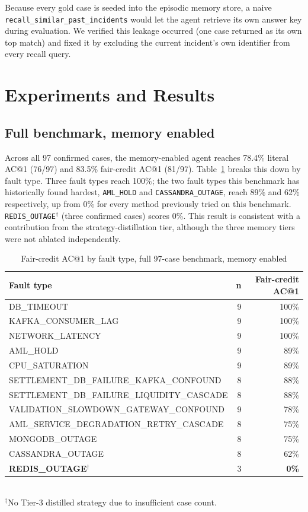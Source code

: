 \documentclass[conference]{IEEEtran}
\begin{document}
Because every gold case is seeded into the episodic memory store, a naive \texttt{recall\_similar\_past\_incidents}
would let the agent retrieve its own answer key during evaluation. We verified this leakage occurred (one case
returned as its own top match) and fixed it by excluding the current incident's own identifier from every
recall query.

\section{Experiments and Results}
\label{sec:results}

\subsection{Full benchmark, memory enabled}

Across all 97 confirmed cases, the memory-enabled agent reaches 78.4\% literal AC@1 (76/97) and 83.5\%
fair-credit AC@1 (81/97). Table~\ref{tab:byfault} breaks this down by fault type. Three fault types reach
100\%; the two fault types this benchmark has historically found hardest, \texttt{AML\_HOLD} and
\texttt{CASSANDRA\_OUTAGE}, reach 89\% and 62\% respectively, up from 0\% for every method previously tried on
this benchmark. \texttt{REDIS\_OUTAGE}$^\dagger$ (three confirmed cases) scores 0\%. This result is consistent
with a contribution from the strategy-distillation tier, although the three memory tiers were not ablated
independently.

\begin{table}[t]
\caption{Fair-credit AC@1 by fault type, full 97-case benchmark, memory enabled}
\label{tab:byfault}
\centering
\footnotesize
\begin{tabular}{@{}p{4.6cm}rr@{}}
\toprule
\textbf{Fault type} & \textbf{n} & \textbf{Fair-credit AC@1} \\
\midrule
DB\_TIMEOUT & 9 & 100\% \\
KAFKA\_CONSUMER\_LAG & 9 & 100\% \\
NETWORK\_LATENCY & 9 & 100\% \\
AML\_HOLD & 9 & 89\% \\
CPU\_SATURATION & 9 & 89\% \\
SETTLEMENT\_DB\_FAILURE\_\allowbreak KAFKA\_CONFOUND & 8 & 88\% \\
SETTLEMENT\_DB\_FAILURE\_\allowbreak LIQUIDITY\_CASCADE & 8 & 88\% \\
VALIDATION\_SLOWDOWN\_\allowbreak GATEWAY\_CONFOUND & 9 & 78\% \\
AML\_SERVICE\_DEGRADATION\_\allowbreak RETRY\_CASCADE & 8 & 75\% \\
MONGODB\_OUTAGE & 8 & 75\% \\
CASSANDRA\_OUTAGE & 8 & 62\% \\
\textbf{REDIS\_OUTAGE}$^\dagger$ & 3 & \textbf{0\%} \\
\bottomrule
\end{tabular}
\\[2pt]
{\scriptsize $^\dagger$No Tier-3 distilled strategy due to insufficient case count.}
\end{table}
\end{document}
